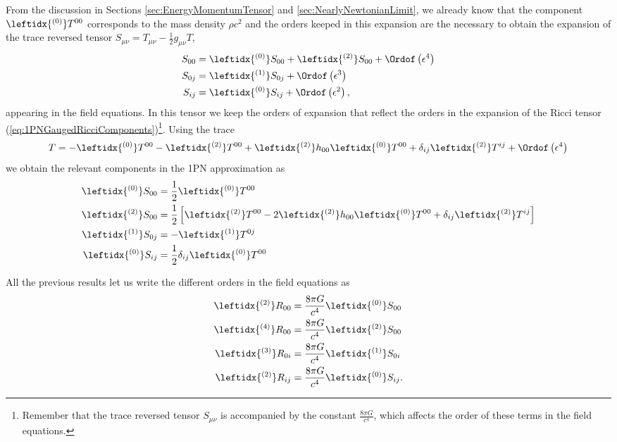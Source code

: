 From the discussion in Sections \ref{sec:EnergyMomentumTensor} and \ref{sec:NearlyNewtonianLimit}, we already know that the component $\leftidx{ ^{(0)}} T^{00} $ corresponds to the mass density $\rho c^2$ and the orders keeped in this expansion are the necessary to obtain the expansion of the trace reversed tensor $S_{\mu \nu} = T_{\mu \nu} - \frac{1}{2} g_{\mu \nu} T $,
\begin{subequations}
\begin{align}
S_{00} &= \leftidx{ ^{(0)}} S_{00} + \leftidx{ ^{(2)}} S_{00} + \Ordof \left( \epsilon^4 \right) \\
S_{0j} &= \leftidx{ ^{(1)}} S_{0j}  + \Ordof \left( \epsilon^3 \right) \\
S_{ij} &= \leftidx{ ^{(0)}} S_{ij} + \Ordof \left( \epsilon^2 \right),
\end{align}
\end{subequations}
 appearing in the field equations. In this tensor we keep the orders of expansion that reflect the orders in the expansion of the Ricci tensor (\ref{eq:1PNGaugedRicciComponents})\footnote{Remember that the trace reversed tensor $S_{\mu \nu}$ is accompanied by the constant $\frac{8\pi G}{c^4}$, which affects the order of these terms in the field equations.}. Using the trace 
\begin{equation}
 T = -\leftidx{^{(0)}} T^{00} -\leftidx{^{(2)}} T^{00} + \leftidx{^{(2)}} h_{00} \leftidx{^{(0)}} T^{00} + \delta_{ij} \leftidx{^{(2)}} T^{ij} + \Ordof \left( \epsilon^4 \right)
 \end{equation} 
we obtain the relevant components in the 1PN approximation as
\begin{subequations} \label{eq:1PNEnergyMomentum}
\begin{align}
\leftidx{ ^{(0)}} S_{00}  &= \frac{1}{2} \leftidx{ ^{(0)}} T^{00} \\
\leftidx{ ^{(2)}} S_{00}  &= \frac{1}{2} \left[ \leftidx{ ^{(2)}} T^{00} - 2 \leftidx{ ^{(2)}} h_{00} \leftidx{ ^{(0)}} T^{00} + \delta_{ij} \leftidx{ ^{(2)}} T^{ij} \right] \\
\leftidx{ ^{(1)}} S_{0j} &=- \leftidx{ ^{(1)}} T^{0j} \\
\leftidx{ ^{(0)}} S_{ij} &= \frac{1}{2} \delta_{ij} \leftidx{ ^{(0)}} T^{00}
\end{align}
\end{subequations}

All the previous results let us write the different orders in the field equations as
\begin{subequations}
\begin{align}
\leftidx{^{(2)}}R_{00} &= \frac{8\pi G}{c^4} \leftidx{^{(0)}}S_{00}  \label{eq:secondorder01} \\
\leftidx{^{(4)}}R_{00} &= \frac{8\pi G}{c^4} \leftidx{^{(2)}}S_{00}  \label{eq:fourthorder} \\
\leftidx{^{(3)}}R_{0i} &= \frac{8\pi G}{c^4} \leftidx{^{(1)}}S_{0i}  \label{eq:thirdorder} \\
\leftidx{^{(2)}}R_{ij} &= \frac{8\pi G}{c^4} \leftidx{^{(0)}}S_{ij}. \label{eq:secondorder02}
\end{align}
\end{subequations}

